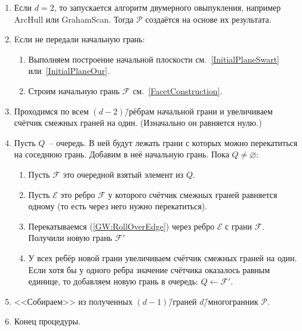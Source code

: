 \documentclass[a4paper,12pt]{article}
\newcommand{\Polytop}{\mathcal{P}}         %
\newcommand{\Facet}{\mathcal{F}}              %
\newcommand{\Edge}{\mathcal{E}}               %
\renewcommand{\.}{\hspace{0.2ex}}
\begin{document}
    \begin{enumerate}

      \item Если $d = 2$, то запускается алгоритм двумерного овыпукления, например ArcHull или GrahamScan. Тогда $\Polytop$ создаётся на основе их результата.

      \item Eсли не передали начальную грань:


      \begin{enumerate}
        \item Выполняем построение начальной плоскости см.~\ref{InitialPlaneSwart} или~\ref{InitialPlaneOur}.


        \item Строим начальную грань $\Facet$ см.~\ref{FacetConstruction}.
      \end{enumerate}


      \item Проходимся по всем $(d-2)$\=/рёбрам начальной грани и увеличиваем счётчик смежных граней на один. (Изначально он равняется нулю.)


      \item Пусть $Q$~-- очередь. В ней будут лежать грани с которых можно перекатиться на соседнюю грань. Добавим в неё начальную грань. Пока $Q \neq \varnothing$:

      \begin{enumerate}
        \item Пусть $\Facet$ это очередной взятый элемент из $Q$.


        \item Пусть $\Edge$ это ребро $\Facet$ у которого счётчик смежных граней равняется одному (то есть через него нужно перекатиться).
        \label{GW:rolling}


        \item Перекатываемся (\ref{GW:RollOverEdge}) через ребро $\Edge$ с грани $\Facet$. Получили новую грань $\Facet'$


        \item У всех ребёр новой грани увеличиваем счётчик смежных граней на один. Если хотя бы у одного ребра значение счётчика оказалось равным единице, то добавляем новую грань в очередь: $Q \leftarrow \Facet'$.
      \end{enumerate}


      \item <<Собираем>> из полученных $(d-1)$\=/граней $d$\=/многогранник $\Polytop$.

      \item Конец процедуры.

    \end{enumerate}
\end{document}

